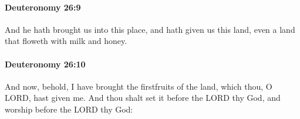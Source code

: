		\paragraph{Deuteronomy 26:9} %
			\label{DEUTERONOMY-26-9}

			And he hath brought us into this place, and hath given us this land, even a land that floweth with milk and honey.


		\paragraph{Deuteronomy 26:10} %
			\label{DEUTERONOMY-26-10}

			And now, behold, I have brought the firstfruits of the land, which thou, O LORD, hast given me. And thou shalt set it before the LORD thy God, and worship before the LORD thy God:


